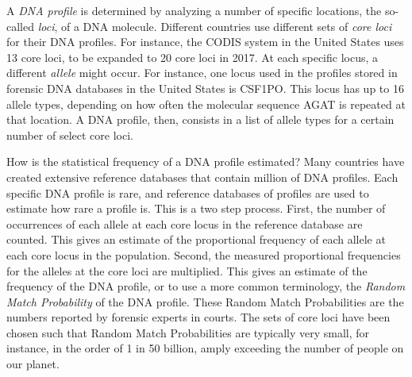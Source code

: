 \documentclass[10pt]{article}
\begin{document}
A \textit{DNA profile} is determined by analyzing a number of specific locations, the so-called \textit{loci}, of a DNA molecule. %
Different countries use different sets of %
\textit{core loci} for their DNA profiles. 
For instance, the CODIS system in the United States uses 13 core loci, to be expanded to 20 core loci in 2017. 
At each specific locus, a different \textit{allele} might occur. 
For instance, one locus used in the profiles stored in forensic DNA databases in the United States is CSF1PO. 
This locus has up to 16 allele types, depending on how often the molecular sequence AGAT is repeated at that location. 
A DNA profile, then, consists in a list of allele types for a certain number of select core loci. 


How is the statistical frequency of a DNA profile estimated?
Many countries have created extensive reference databases that contain million of DNA profiles. 
Each specific DNA profile is rare, and reference databases of profiles 
are used to estimate 
how rare a profile 
is.
This is a two step process. First, the number of occurrences of each allele at each core locus in the reference database are counted.
This gives an estimate of the proportional frequency of each allele at each core locus in the population. Second, the measured proportional frequencies for the alleles at the core loci are 
multiplied. This gives an estimate of the frequency of the DNA profile, or to use a more common terminology, 
the \textit{Random Match Probability} of the DNA profile. %
These Random Match Probabilities are the numbers reported by forensic experts in courts. %
The sets of core loci have been chosen such that Random Match Probabilities are typically very small, for instance, in the order of 1 in 50 billion, amply exceeding the number of people on our planet. 
\end{document}
